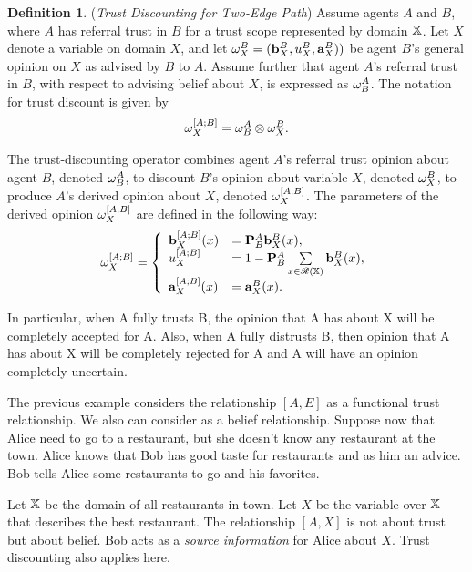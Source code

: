 \documentclass[a4paper,12pt]{article}
\theoremstyle{definition}
\newtheorem{definition}{Definition}[section]
\numberwithin{equation}{section}
\begin{document}
\begin{definition}
(\emph{Trust Discounting for Two-Edge Path}) Assume agents $A$ and $B$, where $A$ has referral trust in $B$ for a trust scope represented by domain $\mathbb{X}$. Let $X$ denote a variable on domain $X$, and let $\omega^{B}_{X} = (\mathbf{b}^{B}_{X}, u^{B}_{X}, \mathbf{a}^{B}_{X}))$ be agent $B$’s general opinion on $X$ as advised by $B$ to $A$. Assume further that agent $A$’s referral trust in $B$, with respect to advising belief about $X$, is expressed as $\omega^{A}_{B}$. The notation for trust discount is given by
\begin{equation}
	\omega^{[A;B]}_{X} = \omega^{A}_{B} \otimes \omega^{B}_{X} \text{.}
\end{equation}

The trust-discounting operator combines agent $A$’s referral trust opinion about agent $B$, denoted $\omega^{A}_{B}$, to discount $B$’s opinion about variable $X$, denoted $\omega^{B}_{X}$, to produce $A$’s derived opinion about $X$, denoted $\omega^{[A;B]}_{X}$. The parameters of the derived opinion $\omega^{[A;B]}_{X}$ are defined in the following way:
\begin{equation}
	\omega^{[A;B]}_{X} = \left\{
	\begin{array}{ll}
		\mathbf{b}^{[A;B]}_{X}(x) & = \mathbf{P}^{A}_{B} \mathbf{b}^{B}_{X}(x) \text{,}\\
		u^{[A;B]}_{X} & = 1 - \mathbf{P}^{A}_{B} \sum\limits_{x \in \mathcal{R}(\mathbb{X})} \mathbf{b}^{B}_{X}(x) \text{,} \\
		\mathbf{a}^{[A;B]}_{X}(x) & = \mathbf{a}^{B}_{X}(x) \text{.}
	\end{array}
	\right.
\end{equation}
\end{definition}

In particular, when A fully trusts B, the opinion that A has about X will be completely accepted for A. Also, when A fully distrusts B, then opinion that A has about X will be completely rejected for A and A will have an opinion completely uncertain.

The previous example considers the relationship $[A, E]$ as a functional trust relationship. We also can consider as a belief relationship. Suppose now that Alice need to go to a restaurant, but she doesn't know any restaurant at the town. Alice knows that Bob has good taste for restaurants and as him an advice. Bob tells Alice some restaurants to go and his favorites.

Let $\mathbb{X}$ be the domain of all restaurants in town. Let $X$ be the variable over $\mathbb{X}$ that describes the best restaurant. The relationship $[A, X]$ is not about trust but about belief. Bob acts as a \emph{source information} for Alice about $X$. Trust discounting also applies here.
\end{document}
